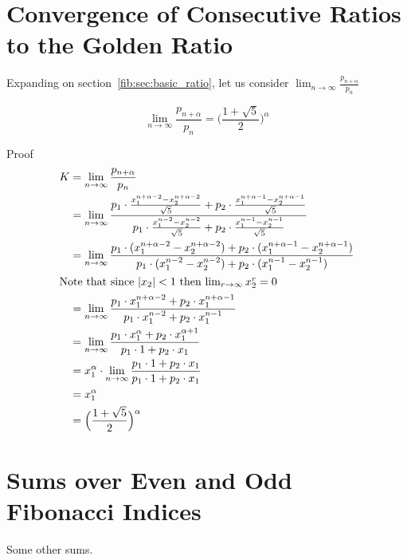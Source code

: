 \documentclass[a4paper]{article}
\begin{document}
\section{Convergence of Consecutive Ratios to the Golden Ratio}\label{fib:sec:ratio-limit}
Expanding on section~\ref{fib:sec:basic_ratio}, let us consider $\lim_{n \to \infty} \frac{p_{n+\alpha}}{p_n}$

\begin{theorem}
\[
\lim_{n \to \infty} \frac{p_{n+\alpha}}{p_n} = \Big(\frac{1+\sqrt{5}}{2}\Big)^{\alpha}
\]

Proof
\begin{gather*}
\begin{split}
K &= \lim_{n \to \infty} \frac{p_{n+\alpha}}{p_n} \\
    &= \lim_{n \to \infty} \frac{
p_1 \cdot \frac{x_1^{n+ \alpha -2} - x_2^{n+\alpha -2}}{\sqrt{5}} + p_2 \cdot \frac{x_1^{n+\alpha-1} - x_2^{n+\alpha-1}}{\sqrt{5}}
    }{
p_1 \cdot \frac{x_1^{n-2} - x_2^{n -2}}{\sqrt{5}} + p_2 \cdot \frac{x_1^{n-1} - x_2^{n-1}}{\sqrt{5}}
    } \\
    &= \lim_{n \to \infty} \frac{
p_1 \cdot (x_1^{n+ \alpha -2} - x_2^{n+\alpha -2} ) + p_2 \cdot (x_1^{n+\alpha-1} - x_2^{n+\alpha-1})
    }{
p_1 \cdot (x_1^{n-2} - x_2^{n -2}) + p_2 \cdot (x_1^{n-1} - x_2^{n-1})
    }\\
\shortintertext{Note that since $|x_2| <1$ then $\lim_{r \to \infty} x_2^r = 0$ }
    &= \lim_{n \to \infty} \frac{
p_1 \cdot x_1^{n+ \alpha -2} + p_2 \cdot x_1^{n+\alpha-1}
    }{
p_1 \cdot x_1^{n-2} + p_2 \cdot x_1^{n-1}
    } \\
    &= \lim_{n \to \infty} \frac{
p_1 \cdot x_1^{\alpha} + p_2 \cdot x_1^{\alpha+1}
    }{
p_1 \cdot 1 + p_2 \cdot x_1
    } \\
    &= x_1^{\alpha} \cdot \lim_{n \to \infty} \frac{
p_1 \cdot 1 + p_2 \cdot x_1
    }{
p_1 \cdot 1 + p_2 \cdot x_1
    } \\
    &=  x_1^{\alpha} \\
    &= \Big(\frac{1+\sqrt{5}}{2}\Big)^{\alpha} \\
\end{split}\\
\end{gather*}
\end{theorem}


\section{Sums over Even and Odd Fibonacci Indices}\label{fib:sec:sum-of-every-other-fibonacci-number}
Some other sums.
\end{document}
